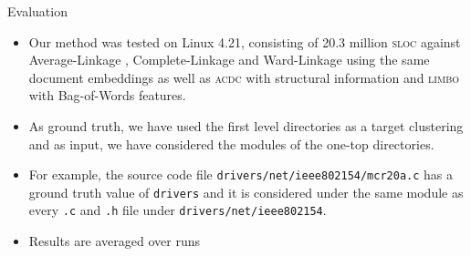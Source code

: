 \documentclass{beamer}
\begin{document}
\begin{frame}{Evaluation}
    
    \begin{itemize}
         \item Our method was tested on Linux 4.21, consisting of 20.3 million \textsc{sloc} against Average-Linkage \cite{average}, Complete-Linkage \cite{complete} and Ward-Linkage \cite{ward} using the same document embeddings as well as \textsc{acdc} with structural information \cite{acdc} and \textsc{limbo} \cite{limbo} with Bag-of-Words features. 
         \item As ground truth, we have used the first level directories as a target clustering and as input, we have considered the modules of the one-top directories. 
         \item For example, the source code file \texttt{drivers/net/ieee802154\-/mcr20a.c} has a ground truth value of \texttt{drivers} and it is considered under the same module as every \texttt{.c} and \texttt{.h} file under \texttt{drivers/net/ieee802154}.
         \item Results are averaged over runs
         
    \end{itemize}
    
\end{frame}
\end{document}
